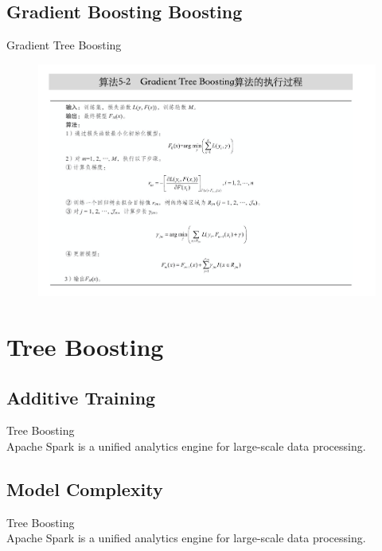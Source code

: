 \subsection{Gradient  Boosting Boosting}
\begin{frame}[plain,t]{Gradient Tree Boosting} 
     \\  
   \begin{figure}
       \centering
       \includegraphics[width=0.9\linewidth]{images/gb2}
       \label{fig:gb2}
   \end{figure}
    
    
    
\end{frame}

\section{Tree Boosting}
\subsection{Additive Training}
\begin{frame}[plain,t]{Tree Boosting} %
     \\  \vspace{2ex}
    Apache Spark is a unified analytics engine for large-scale data processing.
    
    
    
    
\end{frame}

\subsection{Model Complexity}
\begin{frame}[plain,t]{Tree Boosting} %
     \\  \vspace{2ex}
    Apache Spark is a unified analytics engine for large-scale data processing.
    
    
    
    
\end{frame}
